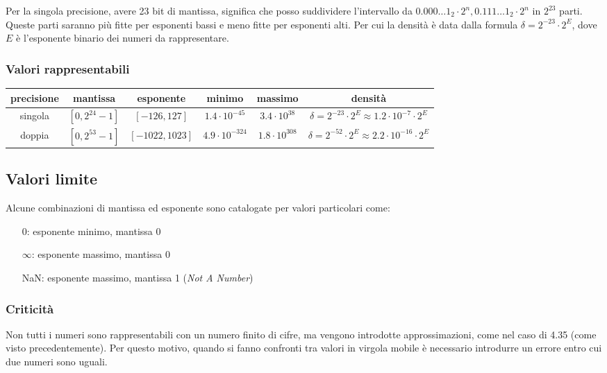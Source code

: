 \documentclass{article}
\begin{document}
Per la singola precisione, avere 23 bit di mantissa, significa che posso suddividere l'intervallo da \(0.000\dots1_2 \cdot 2^n,0.111\dots1_2 \cdot 2^n\)
in \(2^{23}\) parti. Queste parti saranno più fitte per esponenti bassi e meno fitte per esponenti alti. Per cui la densità
è data dalla formula \(\delta = 2^{-23} \cdot 2^E\), dove \(E\) è l'esponente binario dei numeri da rappresentare.


\subsubsection*{Valori rappresentabili}
\begin{center}
	\begin{tabular}{c c c c c c}
		\textbf{precisione} & \textbf{mantissa} & \textbf{esponente} & \textbf{minimo} & \textbf{massimo} & \textbf{densità} \\
		\toprule
		singola & \(\left[0, 2^{24} - 1\right]\) & \(\left[-126, 127\right]\) & \(1.4 \cdot 10^{-45}\) & \(3.4 \cdot 10^{38}\) & \(\delta = 2^{-23} \cdot 2^E \approx 1.2 \cdot 10^{-7} \cdot 2^E\) \\
		\midrule
		doppia & \(\left[0, 2^{53} - 1\right]\) & \(\left[-1022, 1023\right]\) & \(4.9 \cdot 10^{-324}\) & \(1.8 \cdot 10^{308}\) & \(\delta = 2^{-52} \cdot 2^E \approx 2.2 \cdot 10^{-16} \cdot 2^E\) \\
		\bottomrule
	\end{tabular}
\end{center}

\subsection*{Valori limite}
Alcune combinazioni di mantissa ed esponente sono catalogate per valori particolari come:
\begin{itemize} [topsep=3pt, itemsep=0pt]
	\item[\(0\): ] esponente minimo, mantissa 0
	\item[\(\infty\): ] esponente massimo, mantissa 0
	\item[NaN: ] esponente massimo, mantissa 1 (\textit{Not A Number}) 
\end{itemize}

\subsubsection*{Criticità}
Non tutti i numeri sono rappresentabili con un numero finito di cifre, ma vengono introdotte approssimazioni, come nel
caso di 4.35 (come visto precedentemente). Per questo motivo, quando si fanno confronti tra valori in virgola mobile è
necessario introdurre un errore entro cui due numeri sono uguali.
\end{document}
